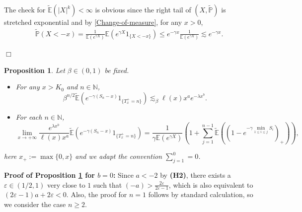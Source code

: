 \documentclass[10pt,a4paper]{amsart}
\newtheorem{prop}[thrm]{Proposition}
\numberwithin{equation}{section}
\begin{document}
  The check for $\widetilde{\mathbb{E}}(|X|^k)<\infty$ is obvious since the right tail of $(X, \widetilde{\mathbb{P}})$ is stretched exponential and by \eqref{Change-of-measure}, for any $x>0$, 
  \begin{align}\label{left-tail-X}
  	\widetilde{\mathbb{P}}(X<-x) = \frac{1}{\mathbb{E}(e^{\gamma X})}\mathbb{E}(e^{\gamma X}1_{\{X<-x\}}) \leq  e^{-\gamma x}  \frac{1}{\mathbb{E}(e^{\gamma X})} \lesssim e^{-\gamma x}.
  \end{align}
 
 
 
 \hfill$\Box$

 
 
 
 


	\begin{prop}\label{prop2}
	Let $\beta \in (0,1)$ be fixed.
	\begin{itemize}
		\item[(i)] For any $x>K_0$ and $n\in\mathbb{N}$,
		\[
	      \beta^{n/2} \widetilde{\mathbb{E}}\left(e^{-\gamma (S_n-x)}1_{\{T_x^+=n\}}\right)  \lesssim_\beta   \ell(x)x^a e^{-\lambda x^b}.
		\]
		\item[(ii)] For each $n\in \mathbb{N}$,
		\[
		\lim_{x\to+\infty} \frac{ e^{\lambda x^b}}{ \ell(x)x^a } \widetilde{\mathbb{E}}\left(e^{-\gamma (S_n-x)}1_{\{T_x^+=n\}}\right)= \frac{1}{\gamma \mathbb{E}(e^{\gamma X})} \left(1+ \sum_{j=1}^{n-1}\widetilde{\mathbb{E}}\left( \left(1-e^{-\gamma \min_{1\leq i\leq j} S_i}\right)_+\right) \right),
		\]
	\end{itemize}
	here $x_+:= \max\{0,x\}$ and we adapt the convention $\sum_{j=1}^0 = 0$.
\end{prop}


\noindent
\textbf{Proof of Proposition \ref{prop2}  for $b=0$:}  
Since $a<-2$ by {\bf(H2)}, there exists a $\varepsilon\in (1/2,1)$ very close to $1$ such that $(-a)>\frac{2\varepsilon}{2\varepsilon -1}$, which is also equivalent to $(2\varepsilon-1)a+2\varepsilon<0$.   Also, the proof for $n=1$ follows by standard calculation, so we consider the case $n\geq 2$. 
\end{document}
